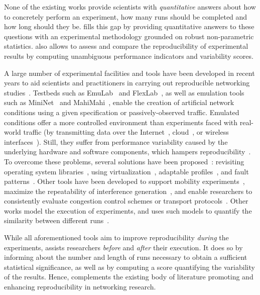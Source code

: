 None of the existing works provide scientists with \emph{quantitative} answers about how to concretely perform an experiment, \eg how many runs should be completed and how long should they be.
\triscale fills this gap by providing quantitative answers to these questions with an experimental methodology grounded on robust non-parametric statistics.
\triscale also allows to assess and compare the reproducibility of experimental results by computing unambiguous performance indicators and variability scores.

A large number of experimental facilities and tools have been developed in recent years to aid scientists and practitioners in carrying out reproducible networking studies~\cite{nussbaum17testbeds}.
Testbeds such as EmuLab~\cite{white02emulab} and FlexLab~\cite{ricci07flexlab}, as well as emulation tools such as MiniNet~\cite{handigol12container} and MahiMahi~\cite{netravali2015mahimahi}, enable the creation of artificial network conditions using a given specification or passively-observed traffic.
Emulated conditions offer a more controlled environment than experiments faced with real-world traffic (\eg by transmitting data over the Internet~\cite{chun03planetlab, berman2014GENI}, cloud~\cite{duplyakin19cloudlab, bolze06grid5000}, or wireless interfaces~\cite{adjih15iotlab, ganu05orbit, massouri14cortexlab}).
Still, they suffer from performance variability caused by the underlying hardware and software components, which hampers reproducibility~\cite{maricq2018Taming}.
To overcome these problems, several solutions have been proposed~\cite{edwards15testbeds}: \eg revisiting  operating system libraries~\cite{tazaki13directcode}, using virtualization~\cite{handigol12container, kannan18bnv, koponen14nvp}, adaptable profiles~\cite{ricci2015Apt}, and fault patterns~\cite{angainor_website}.
Other tools have been developed to support mobility experiments~\cite{cho16phantomnet_repeatability, banerjee2015PhantomNet}, maximize the repeatability of interference generation~\cite{schuss19jamlabng}, and enable researchers to consistently evaluate congestion control schemes or transport protocols~\cite{yan18pantheon}.
Other works model the execution of experiments, and uses such models to quantify the similarity between different runs~\cite{sharma17framework,ferreira2017MetaAnalysis}.

While all aforementioned tools aim to improve reproducibility \emph{during} the experiments, \triscale assists researchers \emph{before} and \emph{after} their execution.
It does so by informing about the number and length of runs necessary to obtain a sufficient statistical significance, as well as by computing a score quantifying the variability of the results.
Hence, \triscale complements the existing body of literature promoting and enhancing reproducibility in networking research.
